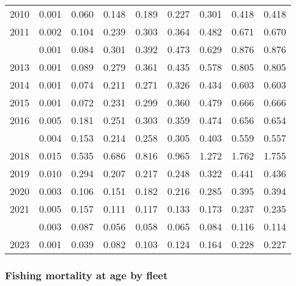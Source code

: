 \documentclass[
]{article}
\begin{document}
\begin{longtable}[t]{lrrrrrrrr}
2010 & 0.001 & 0.060 & 0.148 & 0.189 & 0.227 & 0.301 & 0.418 & 0.418\\
2011 & 0.002 & 0.104 & 0.239 & 0.303 & 0.364 & 0.482 & 0.671 & 0.670\\
\addlinespace
2012 & 0.001 & 0.084 & 0.301 & 0.392 & 0.473 & 0.629 & 0.876 & 0.876\\
2013 & 0.001 & 0.089 & 0.279 & 0.361 & 0.435 & 0.578 & 0.805 & 0.805\\
2014 & 0.001 & 0.074 & 0.211 & 0.271 & 0.326 & 0.434 & 0.603 & 0.603\\
2015 & 0.001 & 0.072 & 0.231 & 0.299 & 0.360 & 0.479 & 0.666 & 0.666\\
2016 & 0.005 & 0.181 & 0.251 & 0.303 & 0.359 & 0.474 & 0.656 & 0.654\\
\addlinespace
2017 & 0.004 & 0.153 & 0.214 & 0.258 & 0.305 & 0.403 & 0.559 & 0.557\\
2018 & 0.015 & 0.535 & 0.686 & 0.816 & 0.965 & 1.272 & 1.762 & 1.755\\
2019 & 0.010 & 0.294 & 0.207 & 0.217 & 0.248 & 0.322 & 0.441 & 0.436\\
2020 & 0.003 & 0.106 & 0.151 & 0.182 & 0.216 & 0.285 & 0.395 & 0.394\\
2021 & 0.005 & 0.157 & 0.111 & 0.117 & 0.133 & 0.173 & 0.237 & 0.235\\
\addlinespace
2022 & 0.003 & 0.087 & 0.056 & 0.058 & 0.065 & 0.084 & 0.116 & 0.114\\
2023 & 0.001 & 0.039 & 0.082 & 0.103 & 0.124 & 0.164 & 0.228 & 0.227\\*
\end{longtable}

\hypertarget{fishing-mortality-at-age-by-fleet}{%
\subsubsection{Fishing mortality at age by
fleet}\label{fishing-mortality-at-age-by-fleet}}
\end{document}
